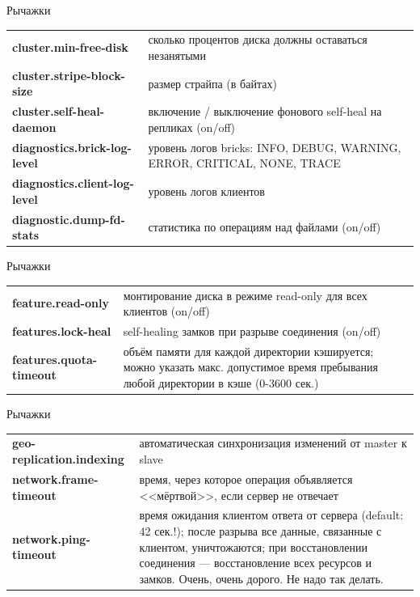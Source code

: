 \documentclass{beamer}
\begin{document}
\begin{frame}{Рычажки}
	\begin{block}{}
		\begin{tabular}{ p{6cm} p{5cm} }
			\textbf{cluster.min-free-disk} & сколько процентов диска должны оставаться незанятыми \\ %
			\textbf{cluster.stripe-block-size} & размер страйпа (в байтах) \\
			\textbf{cluster.self-heal-daemon} & включение / выключение фонового self-heal на репликах (on/off) \\
			\textbf{diagnostics.brick-log-level} & уровень логов bricks: INFO, DEBUG, WARNING, ERROR, CRITICAL, NONE, TRACE \\
			\textbf{diagnostics.client-log-level} & уровень логов клиентов \\
			\textbf{diagnostic.dump-fd-stats} & статистика по операциям над файлами (on/off) \\
		\end{tabular}	
	\end{block}
\end{frame}


\begin{frame}{Рычажки}
	\begin{block}{}
		\begin{tabular}{ p{6cm} p{5cm} }
			\textbf{feature.read-only} & монтирование диска в режиме read-only для всех клиентов (on/off)\\
			\textbf{features.lock-heal} & self-healing замков при разрыве соединения (on/off)\\
			\textbf{features.quota-timeout} & объём памяти для каждой директории кэшируется; можно указать макс. допустимое время пребывания любой директории в кэше (0-3600 сек.) \\
		\end{tabular}
	\end{block}
\end{frame}


\begin{frame}{Рычажки}
	\begin{block}{}
		\begin{tabular}{ p{6cm} p{5cm} }
			\textbf{geo-replication.indexing} & автоматическая синхронизация изменений от master к slave \\
			\textbf{network.frame-timeout} & время, через которое операция объявляется <<мёртвой>>, если сервер не отвечает \\ %
			\textbf{network.ping-timeout} & время ожидания клиентом ответа от сервера (default: 42 сек.!); после разрыва все данные, связанные с клиентом, уничтожаются; при восстановлении соединения --- восстановление всех ресурсов и замков. Очень, очень дорого. Не надо так делать. \\
		\end{tabular}
	\end{block}
\end{frame}
\end{document}
